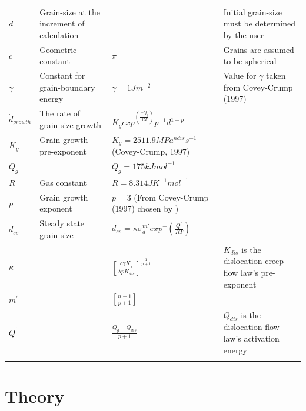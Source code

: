 \documentclass[]{scrreprt}
\begin{document}
\begin{table}
\begin{tabular}{| L{1.3cm} | C{3.95cm} | C{5.25cm} | C{4.95cm} |}
$d$ & {\small Grain-size at the increment of calculation} &  & {\small Initial grain-size must be determined by the user} \\
$c$ & {\small Geometric constant} & $\pi$ & {\small Grains are assumed to be spherical \citep{Austin2009}} \\

$\gamma$ & {\small Constant for grain-boundary energy} & $\gamma = 1 Jm^{-2}$ & {\small Value for $\gamma$ taken from Covey-Crump (1997)} \\

$\dot{d}_{growth}$ & {\small The rate of grain-size growth} & $K_g exp^{\left(\frac{-Q_g}{RT}\right)} p^{-1} d^{1-p}$ &  \\

$K_g$ & {\small Grain growth pre-exponent} & $K_g = 2511.9 MPa^{ndis}s^{-1}$ {\footnotesize (Covey-Crump, 1997)} & \\

$Q_g$ &  & $Q_g = 175 kJ mol^{-1}$ {\footnotesize {}} &  \\

$R$ & {\small Gas constant} & $R = 8.314 JK^{-1}mol^{-1}$  &  \\

$p$ & {\small Grain growth exponent} & $p = 3$ {\footnotesize (From Covey-Crump (1997) chosen by \citet{Herwegh2014})} &  \\

$d_{ss}$ & Steady state grain size & $d_{ss} = \kappa \sigma_{d}^{m'} exp^-{\left(\frac{Q^{'}}{RT}\right)}$  &  \\

$\kappa$ &  & $\left[\frac{c \gamma K_g}{\lambda p K_{dis}}\right]^{\frac{1}{p+1}}$ & {\small 

$K_{dis}$ is the dislocation creep flow law's pre-exponent} \\

$m^{'}$ &  & $\left[\frac{n+1}{p+1}\right]$ &  \\

$Q^{'}$ &  & $\frac{Q_g-Q_{dis}}{p+1}$ & {\small $Q_{dis}$ is the dislocation flow law's activation energy} \\
\noalign{\smallskip}\hline
\end{tabular}
\end{table}

\section{Theory}
\label{section:theory_size_sensitivity}
\end{document}
